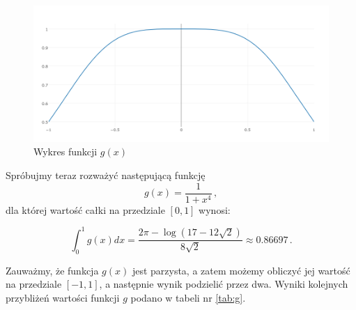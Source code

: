 \documentclass{article}
\begin{document}
    \begin{figure}
      \includegraphics[width=\linewidth]{gplot.png}
      \caption{Wykres funkcji $g(x)$}
      \label{fig:gplot}
    \end{figure}

    Spróbujmy teraz rozważyć następującą funkcję
    \begin{equation*}
      g(x) = \frac{1}{1 + x^4}\,,
    \end{equation*}
    dla której wartość całki na przedziale $[0, 1]$ wynosi:

    \begin{equation*}
      \int_{0}^{1} g(x)dx = \frac{2\pi - \log(17 - 12\sqrt{2})}{8\sqrt{2}} \approx 0.86697\,.
    \end{equation*}

    Zauważmy, że funkcja $g(x)$ jest parzysta, a zatem możemy obliczyć jej wartość
    na przedziale $[-1, 1]$, a następnie wynik podzielić przez dwa. Wyniki kolejnych
    przybliżeń wartości funkcji $g$ podano w tabeli nr \ref{tab:g}.
\end{document}
